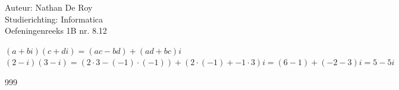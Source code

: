 \documentclass[a4paper]{article}
\begin{document}
  
\noindent \large Auteur: Nathan De Roy \\
\noindent \large Studierichting: Informatica\\
\noindent \large Oefeningenreeks 1B nr. 8.12\\

\medskip

\normalsize

$(a + bi)(c + di) = (ac - bd) + (ad + bc)i$\\

$(2-i)(3-i) = (2\cdot3 - (-1)\cdot(-1)) + (2\cdot(-1) + -1\cdot3)i = (6 - 1) + (-2 - 3)i = 5 - 5i$\\

\begin{thebibliography}{999}
\end{thebibliography}
\end{document}
